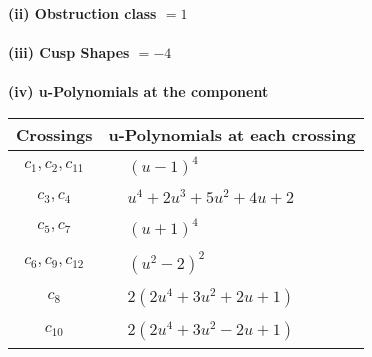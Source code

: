 \documentclass[1p]{elsarticle_modified}
\theoremstyle{definition}
\begin{document}
\flushleft \textbf{(ii) Obstruction class $= 1$}\\~\\
\flushleft \textbf{(iii) Cusp Shapes $= -4$}\\~\\
\newpage\renewcommand{\arraystretch}{1}
\flushleft \textbf{(iv) u-Polynomials at the component}\newline \\
\begin{tabular}{m{50pt}|m{274pt}}
Crossings & \hspace{64pt}u-Polynomials at each crossing \\
\hline $$\begin{aligned}c_{1},c_{2},c_{11}\end{aligned}$$&$\begin{aligned}
&(u-1)^4
\end{aligned}$\\
\hline $$\begin{aligned}c_{3},c_{4}\end{aligned}$$&$\begin{aligned}
&u^4+2 u^3+5 u^2+4 u+2
\end{aligned}$\\
\hline $$\begin{aligned}c_{5},c_{7}\end{aligned}$$&$\begin{aligned}
&(u+1)^4
\end{aligned}$\\
\hline $$\begin{aligned}c_{6},c_{9},c_{12}\end{aligned}$$&$\begin{aligned}
&(u^2-2)^2
\end{aligned}$\\
\hline $$\begin{aligned}c_{8}\end{aligned}$$&$\begin{aligned}
&2(2 u^4+3 u^2+2 u+1)
\end{aligned}$\\
\hline $$\begin{aligned}c_{10}\end{aligned}$$&$\begin{aligned}
&2(2 u^4+3 u^2-2 u+1)
\end{aligned}$\\
\hline
\end{tabular}\\~\\
\end{document}
